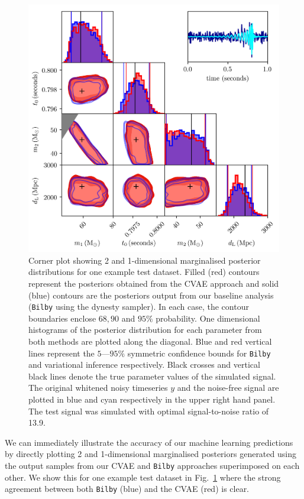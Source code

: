 \documentclass[%
showpacs,
 amsmath,amssymb,
 aps,
 twocolumn,
 prl,
 reprint,
floatfix,
]{revtex4-1}
\begin{document}
%
%
\begin{figure}
    \includegraphics[width=\textwidth]{images/corner_testcase0.png}
    \caption{\label{fig:corner_plot} Corner plot showing 2 and 1-dimensional
marginalised posterior distributions for one example test dataset. Filled (red)
contours represent the posteriors obtained from the \ac{CVAE} approach and
solid (blue) contours are the posteriors output from our baseline analysis
(\texttt{Bilby} using the dynesty sampler). In each case, the contour boundaries
enclose $68,90$ and $95\%$ probability. One dimensional histograms of the
posterior distribution for each parameter from both methods are plotted along
the diagonal. Blue and red vertical lines represent the $5$---$95\%$ symmetric
confidence bounds for \texttt{Bilby} and variational inference respectively.
Black crosses and vertical black lines denote the true parameter values of the
simulated signal. The original whitened noisy timeseries $y$ and the noise-free
signal are plotted in blue and cyan respectively in the upper right hand
panel. The test signal was simulated with optimal signal-to-noise ratio of
13.9.}
\end{figure}

%
%
We can immediately illustrate the accuracy of our machine learning predictions
by directly plotting 2 and 1-dimensional marginalised posteriors generated
using the output samples from our \ac{CVAE} and \texttt{Bilby} approaches
superimposed on each other. We show this for one example test dataset in
Fig.~\ref{fig:corner_plot} where the strong agreement between both
\texttt{Bilby} (blue) and the \ac{CVAE} (red) is clear. 
\end{document}
